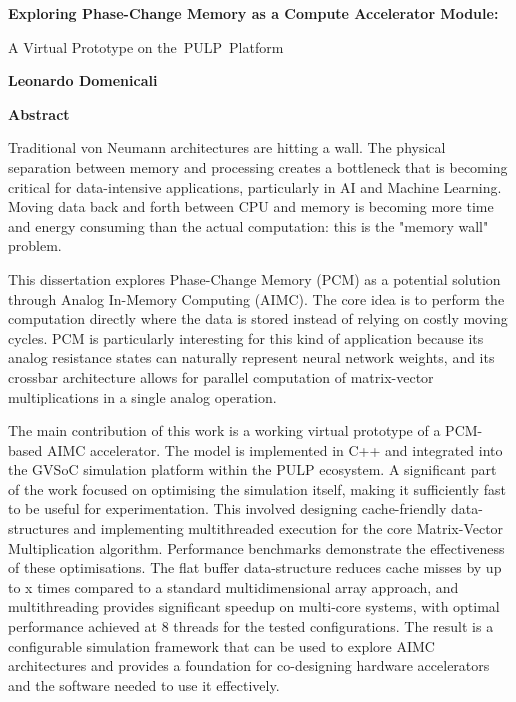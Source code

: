 
\thispagestyle{plain}
\begin{center}
    \Large
    \textbf{Exploring Phase-Change Memory as a Compute Accelerator Module:}
        
    \vspace{0.4cm}
    \large
    A Virtual Prototype on the PULP Platform
        
    \vspace{0.4cm}
    \textbf{Leonardo Domenicali}
       
    \vspace{0.9cm}
    \textbf{Abstract}
\end{center}

Traditional von Neumann architectures are hitting a wall. 
The physical separation between memory and processing creates a bottleneck that is becoming critical for data-intensive applications, 
particularly in AI and Machine Learning. 
Moving data back and forth between CPU and memory is becoming more time and energy consuming than the actual computation: this is the "memory wall" problem.

This dissertation explores Phase-Change Memory (PCM) as a potential solution through Analog In-Memory Computing (AIMC). 
The core idea is to perform the computation directly where the data is stored instead of relying on costly moving cycles. 
PCM is particularly interesting for this kind of application because its analog resistance states can naturally represent neural network weights, 
and its crossbar architecture allows for parallel computation of matrix-vector multiplications in a single analog operation.

The main contribution of this work is a working virtual prototype of a PCM-based AIMC accelerator. 
The model is implemented in C++ and integrated into the GVSoC simulation platform within the PULP ecosystem. 
A significant part of the work focused on optimising the simulation itself, making it sufficiently fast to be useful for experimentation. 
This involved designing cache-friendly data-structures and implementing multithreaded execution for the core Matrix-Vector Multiplication algorithm.
Performance benchmarks demonstrate the effectiveness of these optimisations. 
The flat buffer data-structure reduces cache misses by up to x times compared to a standard multidimensional array approach,  %
and multithreading provides significant speedup on multi-core systems, with optimal performance achieved at 8 threads for the tested configurations.
The result is a configurable simulation framework that can be used to explore AIMC architectures and provides a 
foundation for co-designing hardware accelerators and the software needed to use it effectively.